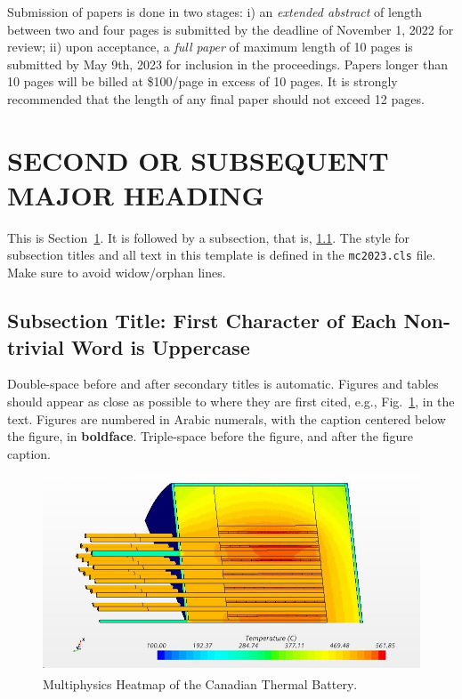 \documentclass[letterpaper]{mc2023}
\begin{document}
Submission of papers is done in two stages: i) an {\it extended abstract} of length between two and four pages is submitted by the deadline of November 1, 2022 for review; ii) upon acceptance, a {\it full paper} of maximum length of 10 pages is submitted by May 9th, 2023 for inclusion in the proceedings.    
Papers longer than 10 pages
will be billed at \$100/page in excess of 10 pages.  It is strongly recommended
that the length of any final paper should not exceed 12 pages.

\section{SECOND OR SUBSEQUENT MAJOR HEADING} 
\label{sec:first}

This is Section~\ref{sec:first}. It is followed by a subsection, that is, 
\ref{sec:second}. The style for subsection titles and all text in this template is defined 
in the \texttt{mc2023.cls} file.  Make sure to avoid widow/orphan lines.

\subsection{Subsection Title: First Character of Each Non-trivial Word is Uppercase} 
\label{sec:second}

Double-space before and after secondary titles is automatic.  Figures and 
tables should appear as close as possible to where they are first
cited, e.g., Fig.~\ref{fig:mcd}, in the text.  Figures are numbered in Arabic 
numerals, with the caption centered below the figure, in \textbf{boldface}. 
Triple-space before the figure, and after the figure caption.\\

\begin{figure}[!htb]
  \centering
  \includegraphics[scale=0.46]{CNBHeatMap.jpg}
  \caption{Multiphysics Heatmap of the Canadian Thermal Battery\textsuperscript{\texttrademark}. }
  \label{fig:mcd}
\end{figure}
\end{document}
